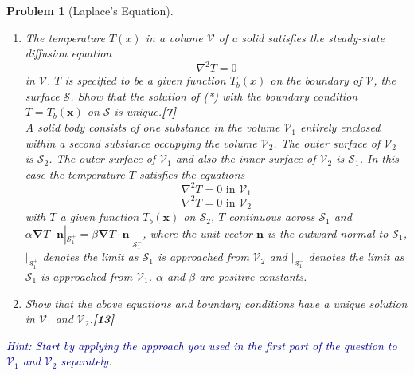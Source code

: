 \documentclass[a4paper]{article}
\theoremstyle{new}
\newtheorem{qns}{Problem}[section]
\begin{document}
\begin{qns}[Laplace's Equation]\leavevmode
\begin{enumerate}[label=(\roman*)]
\item The temperature $T(x)$ in a volume $\mathcal{V}$ of a solid satisfies the steady-state diffusion equation
\begin{equation}
    \nabla^2T=0\tag{*}
\end{equation}
in $\mathcal{V}$. $T$ is specified to be a given function $T_b(x)$ on the boundary of $\mathcal{V}$, the surface $\mathcal{S}$. Show that the solution of (*) with the boundary condition $T=T_b(\mathbf{x})$ on $\mathcal{S}$ is unique.\hfill\textbf{[7]}\\[5pt]
A solid body consists of one substance in the volume $\mathcal{V}_1$ entirely enclosed within a second substance occupying the volume $\mathcal{V}_2$. The outer surface of $\mathcal{V}_2$ is $\mathcal{S}_2$. The outer
surface of $\mathcal{V}_1$ and also the inner surface of $\mathcal{V}_2$ is $\mathcal{S}_1$. In this case the temperature $T$ satisfies the equations
$$\nabla^2T=0\text{ in }\mathcal{V}_1$$
$$\nabla^2T=0\text{ in }\mathcal{V}_2$$
with $T$ a given function $T_b(\mathbf{x})$ on $\mathcal{S}_2$, $T$ continuous across $\mathcal{S}_1$ and $\alpha\boldsymbol{\nabla}T\cdot\mathbf{n}|_{\mathcal{S}_1^+}=\beta\boldsymbol{\nabla}T\cdot\mathbf{n}|_{\mathcal{S}_1^-}$, where the unit vector $\mathbf{n}$ is the outward normal to $\mathcal{S}_1$, $|_{\mathcal{S}_1^+}$ denotes the limit as $\mathcal{S}_1$ is approached from $\mathcal{V}_2$ and $|_{\mathcal{S}^−_1}$ denotes the limit as $\mathcal{S}_1$ is approached from $\mathcal{V}_1$. $\alpha$ and $\beta$ are positive constants.
\item Show that the above equations and boundary conditions have a unique solution in $\mathcal{V}_1$ and $\mathcal{V}_2$.\hfill\textbf{[13]}
\end{enumerate}
\begin{mdframed}
\textcolor{darkblue}{Hint: Start by applying the approach you used in the first part of the question to $\mathcal{V}_1$ and $\mathcal{V}_2$ separately.}
\end{mdframed}
\end{qns}
\end{document}
